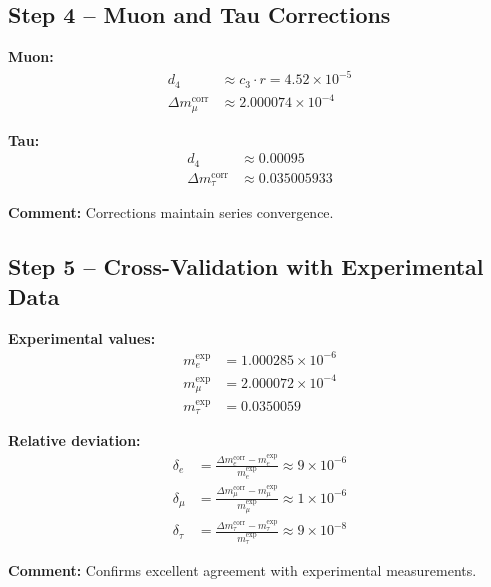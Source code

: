 \documentclass[12pt,a4paper]{article}
\begin{document}
\subsection{Step 4 – Muon and Tau Corrections}

\textbf{Muon:}
\begin{align}
	d_4 &\approx c_3 \cdot r = 4.52 \times 10^{-5} \\
	\Delta m_\mu^\text{corr} &\approx 2.000074 \times 10^{-4}
\end{align}

\textbf{Tau:}
\begin{align}
	d_4 &\approx 0.00095 \\
	\Delta m_\tau^\text{corr} &\approx 0.035005933
\end{align}

\textbf{Comment:} Corrections maintain series convergence.

\subsection{Step 5 – Cross-Validation with Experimental Data}

\textbf{Experimental values:}
\begin{align}
	m_e^\text{exp} &= 1.000285 \times 10^{-6} \\
	m_\mu^\text{exp} &= 2.000072 \times 10^{-4} \\
	m_\tau^\text{exp} &= 0.0350059
\end{align}

\textbf{Relative deviation:}
\begin{align}
	\delta_e &= \frac{\Delta m_e^\text{corr} - m_e^\text{exp}}{m_e^\text{exp}} \approx 9 \times 10^{-6} \\
	\delta_\mu &= \frac{\Delta m_\mu^\text{corr} - m_\mu^\text{exp}}{m_\mu^\text{exp}} \approx 1 \times 10^{-6} \\
	\delta_\tau &= \frac{\Delta m_\tau^\text{corr} - m_\tau^\text{exp}}{m_\tau^\text{exp}} \approx 9 \times 10^{-8}
\end{align}

\textbf{Comment:} Confirms excellent agreement with experimental measurements.

\end{document}
